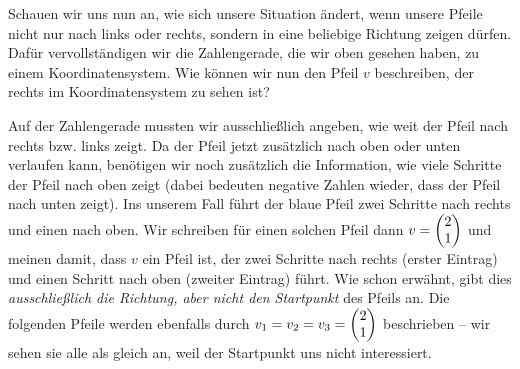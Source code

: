 \documentclass[../../main.tex]{subfiles}
\begin{document}
Schauen wir uns nun an, wie sich unsere Situation ändert, wenn unsere Pfeile nicht nur nach links oder rechts, sondern
in eine beliebige Richtung zeigen dürfen. Dafür vervollständigen wir die Zahlengerade, die wir oben gesehen haben, zu
einem Koordinatensystem. Wie können wir nun den Pfeil $v$ beschreiben, der rechts im Koordinatensystem zu sehen ist?

Auf der Zahlengerade mussten wir ausschließlich angeben, wie weit der Pfeil nach rechts bzw. links zeigt. Da der Pfeil
jetzt zusätzlich nach oben oder unten verlaufen kann, benötigen wir noch zusätzlich die Information, wie viele Schritte
der Pfeil nach oben zeigt (dabei bedeuten negative Zahlen wieder, dass der Pfeil nach unten zeigt). Ins unserem Fall
führt der blaue Pfeil zwei Schritte nach rechts und einen nach oben. Wir schreiben für einen solchen Pfeil dann 
$v=\begin{pmatrix} 2\\ 1 \end{pmatrix}$ und meinen damit, dass $v$ ein Pfeil ist, der zwei Schritte nach rechts (erster Eintrag) und einen 
Schritt nach oben (zweiter Eintrag) führt. Wie schon erwähnt, gibt dies \emph{ausschließlich die Richtung, aber nicht 
den Startpunkt} des Pfeils an. Die folgenden Pfeile werden ebenfalls durch $v_1=v_2=v_3=\begin{pmatrix} 2\\ 1 \end{pmatrix}$ beschrieben -- 
wir sehen sie alle als gleich an, weil der Startpunkt uns nicht interessiert.
\begin{multicols}{3}
\end{multicols}
\end{document}
